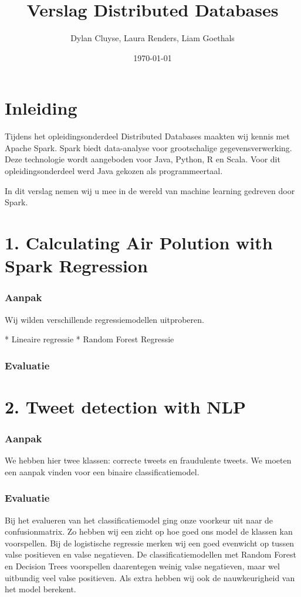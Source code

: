 \documentclass[a4paper,12pt,twoside]{report}
\title{
    Verslag Distributed Databases
    }
\author{Dylan {Cluyse}, Laura {Renders}, Liam {Goethals}}
\date{\today}
\begin{document}
\maketitle

\chapter*{Inleiding}

Tijdens het opleidingsonderdeel Distributed Databases maakten wij kennis met Apache Spark. Spark biedt data-analyse voor grootschalige gegevensverwerking. Deze technologie wordt aangeboden voor Java, Python, R en Scala. Voor dit opleidingsonderdeel werd Java gekozen als programmeertaal.

In dit verslag nemen wij u mee in de wereld van machine learning gedreven door Spark.

\chapter*{1. Calculating Air Polution with Spark Regression}

\subsection*{Aanpak}
Wij wilden verschillende regressiemodellen uitproberen.

* Lineaire regressie
* Random Forest Regressie

\subsection*{Evaluatie}

\chapter*{2. Tweet detection with NLP}

\subsection*{Aanpak}
We hebben hier twee klassen: correcte tweets en fraudulente tweets. We moeten een aanpak vinden voor een binaire classificatiemodel.

\subsection*{Evaluatie}
Bij het evalueren van het classificatiemodel ging onze voorkeur uit naar de confusionmatrix. Zo hebben wij een zicht op hoe goed ons model de klassen kan voorspellen. Bij de logistische regressie merken wij een goed evenwicht op tussen valse positieven en valse negatieven. De classificatiemodellen met Random Forest en Decision Trees voorspellen daarentegen weinig valse negatieven, maar wel uitbundig veel valse positieven. Als extra hebben wij ook de nauwkeurigheid van het model berekent.
\end{document}
